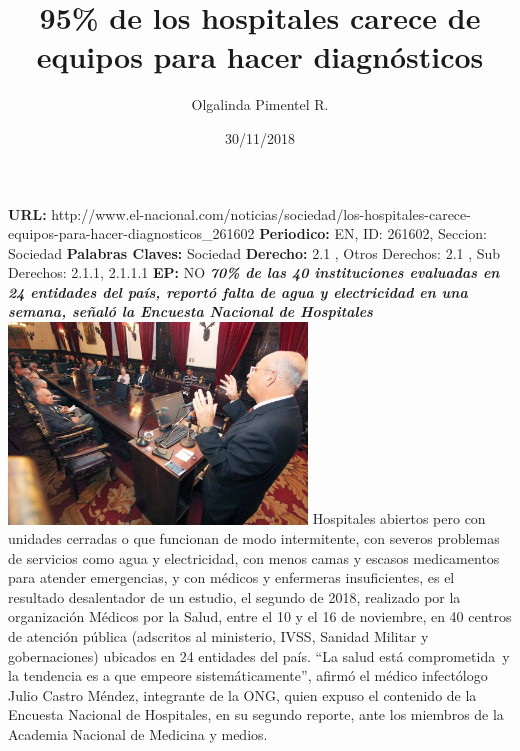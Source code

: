 \documentclass{article}%
\title{\textbf{95\% de los hospitales carece de equipos para hacer diagnósticos}}%
\author{Olgalinda Pimentel R.}%
\date{30/11/2018}%
\begin{document}
%
\normalsize%
\maketitle%
\textbf{URL: }%
http://www.el{-}nacional.com/noticias/sociedad/los{-}hospitales{-}carece{-}equipos{-}para{-}hacer{-}diagnosticos\_261602\newline%
%
\textbf{Periodico: }%
EN, %
ID: %
261602, %
Seccion: %
Sociedad\newline%
%
\textbf{Palabras Claves: }%
Sociedad\newline%
%
\textbf{Derecho: }%
2.1%
, Otros Derechos: %
2.1%
, Sub Derechos: %
2.1.1, 2.1.1.1%
\newline%
%
\textbf{EP: }%
NO\newline%
\newline%
%
\textbf{\textit{70\% de las 40 instituciones evaluadas en 24 entidades del país, reportó falta de agua y electricidad en una semana, señaló la Encuesta Nacional de Hospitales}}%
\newline%
\newline%
%
\includegraphics[width=300px]{131.jpg}%
\newline%
%
Hospitales abiertos pero con unidades cerradas o que funcionan de modo intermitente, con severos problemas de servicios como agua y electricidad, con menos camas y escasos medicamentos para atender emergencias, y con médicos y enfermeras insuficientes, es el resultado desalentador de un estudio, el segundo de 2018, realizado por la organización Médicos por la Salud, entre el 10 y el 16 de noviembre, en 40 centros de atención pública (adscritos al ministerio, IVSS, Sanidad Militar y gobernaciones) ubicados en 24 entidades del país. “La salud está comprometida~y la tendencia es a que empeore sistemáticamente”, afirmó el médico infectólogo Julio Castro Méndez, integrante de la ONG, quien expuso el contenido de la Encuesta Nacional de Hospitales, en su segundo reporte, ante los miembros de la Academia Nacional de Medicina y medios.%
\newline%
\end{document}
